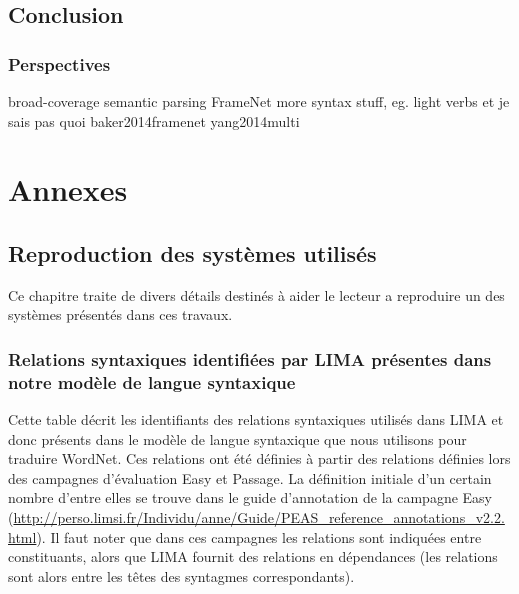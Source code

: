 \documentclass[oneside,parskip,draft]{scrbook}
\begin{document}




\chapter*{Conclusion}
\label{ch:conc}

\section{Perspectives}

broad-coverage semantic parsing
FrameNet more syntax stuff, eg. light verbs et je sais pas quoi baker2014framenet yang2014multi

\backmatter




\part{Annexes}

\chapter{Reproduction des systèmes utilisés}

Ce chapitre traite de divers détails destinés à aider le lecteur a reproduire
un des systèmes présentés dans ces travaux.

\section{Relations syntaxiques identifiées par LIMA présentes dans notre modèle
de langue syntaxique}

Cette table décrit les identifiants des relations syntaxiques utilisés dans
LIMA et donc présents dans le modèle de langue syntaxique que nous utilisons
pour traduire WordNet. Ces relations ont été définies à partir des relations
définies lors des campagnes d'évaluation Easy et Passage. La définition
initiale d'un certain nombre d'entre elles se trouve dans le guide d'annotation
de la campagne Easy
(\url{http://perso.limsi.fr/Individu/anne/Guide/PEAS_reference_annotations_v2.2.html}).
Il faut noter que dans ces campagnes les relations sont indiquées entre
constituants, alors que LIMA fournit des relations en dépendances (les
relations sont alors entre les têtes des syntagmes correspondants).
\end{document}
